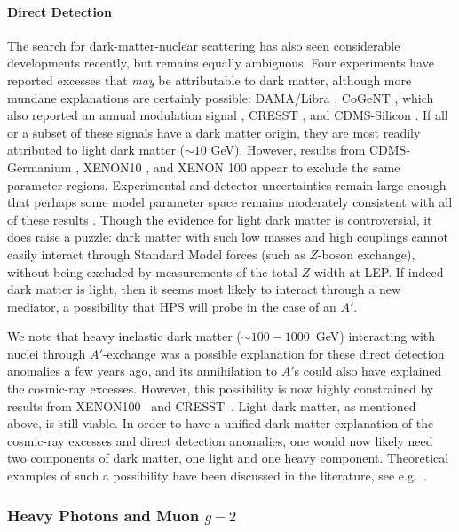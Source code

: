 \paragraph{Direct Detection}
 The search for dark-matter-nuclear scattering has also seen considerable developments recently, but remains equally ambiguous.  Four experiments have reported excesses that \emph{may} be attributable to dark matter, although more mundane explanations 
are certainly possible: DAMA/Libra \cite{Bernabei:2010mq}, CoGeNT \cite{Aalseth:2010vx}, which also reported an annual modulation signal \cite{Aalseth:2011wp},  CRESST \cite{Angloher:2011uu}, and CDMS-Silicon \cite{Agnese:2013dwa}. 
If all or a subset of these signals have a dark matter origin,  they are most readily attributed to light dark matter ($\sim 10$ GeV).  
However, results from CDMS-Germanium \cite{CDMS}, XENON10 \cite{Angle:2011th}, and XENON 100 \cite{Aprile:2011hi} appear to exclude the same parameter regions.  Experimental and detector uncertainties remain large enough that perhaps some model parameter space remains 
moderately consistent with all of these results \cite{Kelso:2011gd}.  
Though the evidence for light dark matter is controversial, it does raise a puzzle: dark matter with such low masses and high couplings cannot easily interact through Standard Model forces (such as $Z$-boson exchange), without being excluded by measurements of the total $Z$ width at LEP. If indeed dark matter is light, then it seems most likely to interact through a new mediator, a possibility that HPS will probe in the case of an $A'$.

We note that heavy inelastic dark matter ($\sim 100-1000$~GeV) interacting with nuclei through $A'$-exchange was a possible explanation for 
these direct detection anomalies a few years ago, and its annihilation to $A'$s could also have explained the cosmic-ray excesses.  However, 
this possibility is now highly constrained by results from XENON100~\cite{Aprile:2011ts} and CRESST~\cite{Angloher:2011uu}.  Light dark matter, 
as mentioned above, is still viable.  In order to have a unified dark matter explanation of the cosmic-ray excesses and direct detection 
anomalies, one would now likely need two components of dark matter, one light and one heavy component.  Theoretical examples of 
such a possibility have been discussed in the literature, see e.g.~\cite{Essig:2010ye}.


\subsubsection{Heavy Photons and Muon $g-2$}

